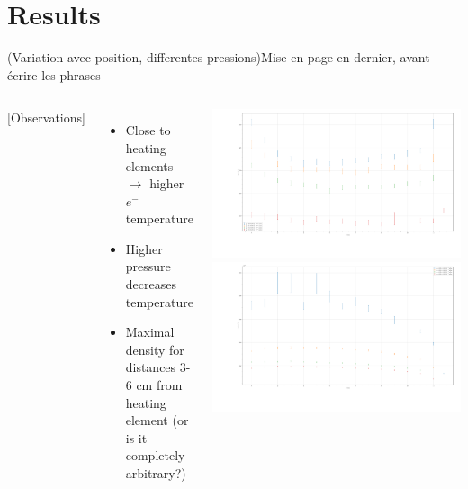 \documentclass[10pt]{beamer}
\begin{document}
\section{Results}
\begin{frame}{(Variation avec position, differentes pressions)}{Mise en page en dernier, avant écrire les phrases}
    \begin{columns}
        [Observations]

        \begin{itemize}
            \item Close to heating elements \(\rightarrow\) higher \(e^-\) temperature
            \item Higher pressure decreases temperature
            \item Maximal density for distances 3-6 cm from heating element (or is it completely arbitrary?)
        \end{itemize}

        \centering
        \includegraphics[scale=1]{../figures/temperatureeV_position.pdf}
        \includegraphics[scale=1]{../figures/density_position.pdf}
    \end{columns}
\end{frame}
    
\end{document}
